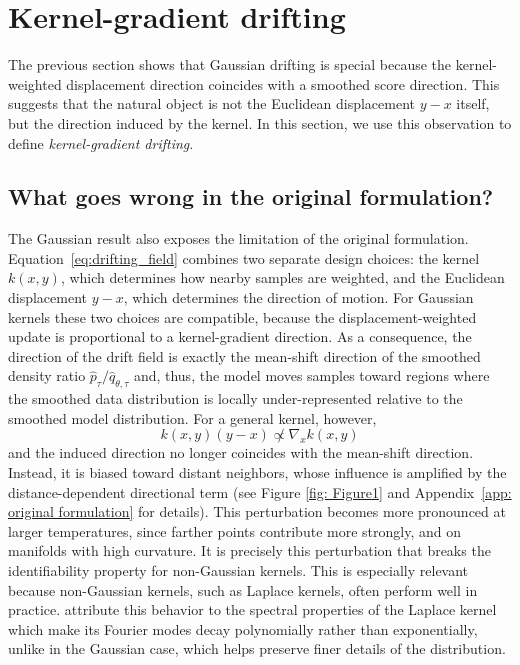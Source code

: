 \documentclass{article}
\theoremstyle{plain}
\begin{document}
\section{Kernel-gradient drifting}
\label{sec:kernel_gradient_drifting}

The previous section shows that Gaussian drifting is special because the kernel-weighted displacement direction coincides with a smoothed score direction. This suggests that the natural object is not the Euclidean displacement
\(y-x\) itself, but the direction induced by the kernel. In this section, we use this observation to define \textit{kernel-gradient drifting}.

\subsection{What goes wrong in the original formulation?}
The Gaussian result also exposes the limitation of the original formulation. Equation~\eqref{eq:drifting_field} combines two separate design choices: the kernel \(k(x,y)\), which determines how nearby samples are weighted, and the Euclidean displacement \(y-x\), which determines the direction of motion. For Gaussian kernels these two choices are compatible, because the displacement-weighted update is proportional to a kernel-gradient direction. As a consequence, the direction of the drift field is exactly the mean-shift direction of the smoothed density ratio
\(\hat p_\tau / \hat q_{\theta,\tau}\) and, thus, the model moves samples toward regions where the smoothed data distribution is locally under-represented relative to the smoothed model distribution. For a general kernel, however,
\[
k(x,y)(y-x)
\not\propto
\nabla_x k(x,y)
\]
and the induced direction no longer coincides with the mean-shift direction. Instead, it is biased toward distant neighbors, whose influence is amplified by the distance-dependent directional term (see Figure \ref{fig: Figure1} and Appendix~\ref{app: original formulation} for details). This perturbation becomes more pronounced at larger temperatures, since farther points contribute more strongly, and on manifolds with high curvature. It is precisely this perturbation that breaks the identifiability property for non-Gaussian kernels. This is especially relevant because non-Gaussian kernels, such as Laplace kernels, often perform well in practice.  \citet{Turan_2026_Drifting} attribute this behavior to the spectral properties of the Laplace kernel which make its Fourier modes decay polynomially rather than exponentially, unlike in the Gaussian case, which helps preserve finer details of the distribution.  
\end{document}
